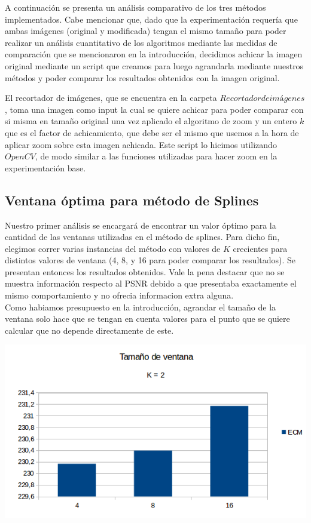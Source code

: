 A continuación se presenta un análisis comparativo de los tres métodos implementados.
Cabe mencionar que, dado que la experimentación requería que ambas imágenes (original y modificada) tengan el mismo tamaño para poder realizar un análisis cuantitativo de los algoritmos mediante las medidas de comparación que se mencionaron en la introducción, decidimos achicar la imagen original mediante un script que creamos para luego agrandarla mediante nuestros métodos y poder comparar los resultados obtenidos con la imagen original.

El recortador de imágenes, que se encuentra en la carpeta $Recortador de imágenes$, toma una imagen como input la cual se quiere achicar para poder comparar con si misma en tamaño original una vez aplicado el algoritmo de zoom y un entero $k$ que es el factor de achicamiento, que debe ser el mismo que usemos a la hora de aplicar zoom sobre esta imagen achicada. Este script lo hicimos utilizando $OpenCV$, de modo similar a las funciones utilizadas para hacer zoom en la experimentación base.

\subsection{Ventana óptima para método de Splines}
Nuestro primer análisis se encargará de encontrar un valor óptimo para la cantidad de las ventanas utilizadas en el método de splines.
Para dicho fin, elegimos correr varias instancias del método con valores de $K$ crecientes para distintos valores de ventana (4, 8, y 16 para poder comparar los resultados). Se presentan entonces los resultados obtenidos. Vale la pena destacar que no se muestra información respecto al PSNR debido a que presentaba exactamente el mismo comportamiento y no ofrecia informacion extra alguna.
\\
Como habiamos presupuesto en la introducción, agrandar el tamaño de la ventana solo hace que se tengan en cuenta valores para el punto que se quiere calcular que no depende directamente de este. 

\begin{center}
\includegraphics[scale=0.50]{imagenes/VK2.png}
\end{center}

